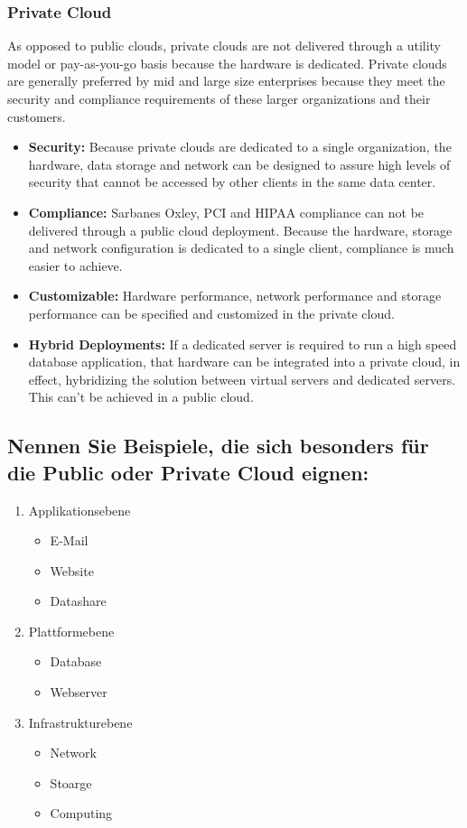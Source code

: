 \documentclass[a4,12pt]{scrartcl}
\begin{document}
\subsubsection{Private Cloud}
As opposed to public clouds, private clouds are not delivered through a utility model or pay-as-you-go basis because the hardware is dedicated. Private clouds are generally preferred by mid and large size enterprises because they meet the security and compliance requirements of these larger organizations and their customers.
\begin{itemize}
\item \textbf{Security:} Because private clouds are dedicated to a single organization, the hardware, data storage and network can be designed to assure high levels of security that cannot be accessed by other clients in the same data center.
\item \textbf{Compliance:} Sarbanes Oxley, PCI and HIPAA compliance can not be delivered through a public cloud deployment. Because the hardware, storage and network configuration is dedicated to a single client, compliance is much easier to achieve.
\item \textbf{Customizable:} Hardware performance, network performance and storage performance can be specified and customized in the private cloud.
\item\textbf{Hybrid Deployments:} If a dedicated server is required to run a high speed database application, that hardware can be integrated into a private cloud, in effect, hybridizing the solution between virtual servers and dedicated servers. This can’t be achieved in a public cloud.
\end{itemize}

\subsection{Nennen Sie Beispiele, die sich besonders für die Public oder Private Cloud eignen:}
\begin{enumerate}
  \item Applikationsebene
  \begin{itemize}
	\item E-Mail
	\item Website
	\item Datashare
	\end{itemize}
  \item Plattformebene
    \begin{itemize}
	\item Database
	\item Webserver
	\end{itemize}
  \item Infrastrukturebene
    \begin{itemize}
	\item Network
	\item Stoarge
	\item Computing
	\end{itemize}
\end{enumerate}
\end{document}
